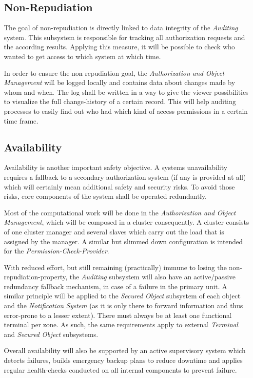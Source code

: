 \documentclass[12pt,a4paper,titlepage,oneside]{scrartcl}
\begin{document}
\subsection{Non-Repudiation}
The goal of non-repudiation is directly linked to data integrity of the \emph{Auditing} system. This subsystem is responsible for tracking all authorization requests and the according results. Applying this measure, it will be possible to check who wanted to get access to which system at which time.

In order to ensure the non-repudiation goal, the \emph{Authorization and Object Management} will be logged locally and contains data about changes made by whom and when. The log shall be written in a way to give the viewer possibilities to visualize the full change-history of a certain record. This will help auditing processes to easily find out who had which kind of access permissions in a certain time frame.

\subsection{Availability}
Availability is another important safety objective. A systems unavailability requires a fallback to a secondary authorization system (if any is provided at all) which will certainly mean additional safety and security risks. To avoid those risks, core components of the system shall be operated redundantly.

Most of the computational work will be done in the \emph{Authorization and Object Management}, which will be composed in a cluster consequently. A cluster consists of one cluster manager and several slaves which carry out the load that is assigned by the manager. A similar but slimmed down configuration is intended for the \emph{Permission-Check-Provider}.

With reduced effort, but still remaining (practically) immune to losing the non-repudiation-property, the \emph{Auditing} subsystem will also have an active/passive redundancy fallback mechanism, in case of a failure in the primary unit. A similar principle will be applied to the \emph{Secured Object} subsystem of each object and the \emph{Notification System} (as it is only there to forward information and thus error-prone to a lesser extent). There must always be at least one functional terminal per zone. As such, the same requirements apply to external \emph{Terminal} and \emph{Secured Object} subsystems.

Overall availability will also be supported by an active supervisory system which detects failures, builds emergency backup plans to reduce downtime and applies regular health-checks conducted on all internal components to prevent failure.
\end{document}
